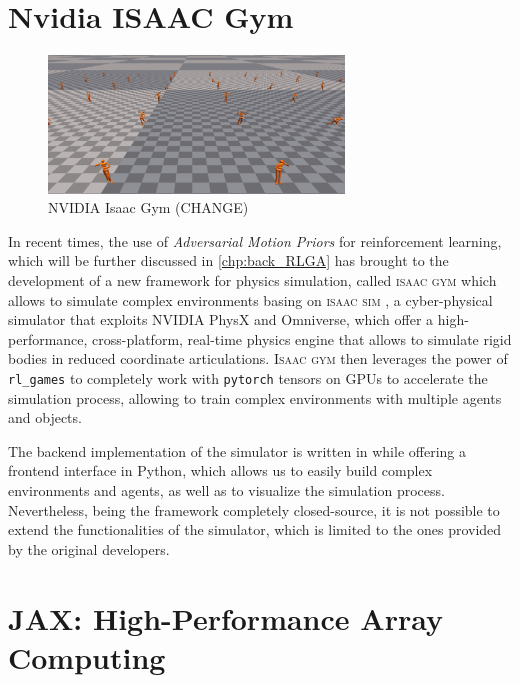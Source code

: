 \section{Nvidia ISAAC Gym}

\begin{figure}
    \centering
    \caption{NVIDIA Isaac Gym (CHANGE)}
    \label{fig:isaac_gym}
    \includegraphics[width=0.7\textwidth]{Images/isaacgym_humanoid.png}
\end{figure}

In recent times, the use of \textit{Adversarial Motion Priors} \citep{peng_amp_2021} for reinforcement learning, which will be further discussed in \cref{chp:back_RLGA} has brought to the development of a new framework for physics simulation, called \textsc{isaac gym} \citep{makoviychuk_isaac_2021} which allows to simulate complex environments basing on \textsc{isaac sim} \citep{zhou_towards_2023}, a cyber-physical simulator that exploits NVIDIA PhysX and Omniverse, which offer a high-performance, cross-platform, real-time physics engine that allows to simulate rigid bodies in reduced coordinate articulations. \textsc{Isaac gym} then leverages the power of \texttt{rl\_games} \citep{rl-games2021} to completely work with \texttt{pytorch} \citep{paszke_pytorch_2019} tensors on \ac{GPU}s to accelerate the simulation process, allowing to train complex environments with multiple agents and objects.

The backend implementation of the simulator is written in \cpp while offering a frontend interface in Python, which allows us to easily build complex environments and agents, as well as to visualize the simulation process. Nevertheless, being the framework completely closed-source, it is not possible to extend the functionalities of the simulator, which is limited to the ones provided by the original developers.

\section{JAX: High-Performance Array Computing}

